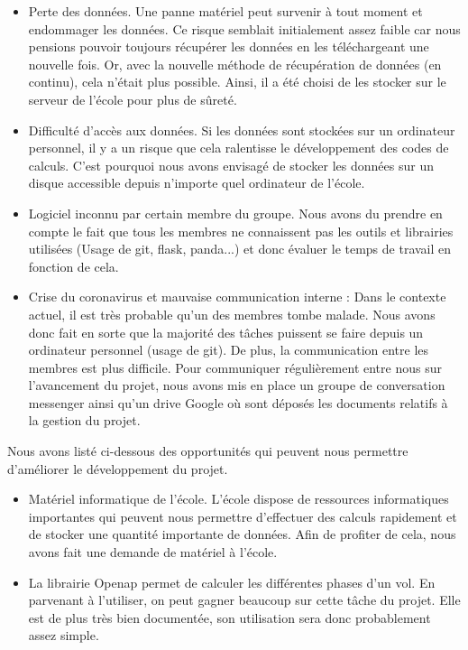 \begin{itemize}
	\item Perte des données. Une panne matériel peut survenir à tout moment et endommager les données. Ce risque semblait initialement assez faible car nous pensions pouvoir toujours récupérer les données en les téléchargeant une nouvelle fois. Or, avec la nouvelle méthode de récupération de données (en continu), cela n'était plus possible. Ainsi, il a été choisi de les stocker sur le serveur de l'école pour plus de sûreté. 
	
	\item Difficulté d'accès aux données. Si les données sont stockées sur un ordinateur personnel, il y a un risque que cela ralentisse le développement des codes de calculs. C'est pourquoi nous avons envisagé de stocker les données sur un disque accessible depuis n'importe quel ordinateur de l'école.
	
	\item Logiciel inconnu par certain membre du groupe. Nous avons du  prendre en compte le fait que tous les membres ne connaissent pas les outils et librairies utilisées (Usage de git, flask, panda...) et donc évaluer le temps de travail en fonction de cela.

	\item Crise du coronavirus et mauvaise communication interne : Dans le contexte actuel, il est très probable qu'un des membres tombe malade. Nous avons donc fait en sorte que la majorité des tâches puissent se faire depuis un ordinateur personnel (usage de git). De plus, la communication entre les membres est plus difficile. Pour communiquer régulièrement entre nous sur l'avancement du projet, nous avons mis en place un groupe de conversation messenger ainsi qu'un drive Google où sont déposés les documents relatifs à la gestion du projet.
	
\end{itemize}


Nous avons listé ci-dessous des opportunités qui peuvent nous permettre d'améliorer le développement du projet.

\begin{itemize}
	\item Matériel informatique de l'école. L'école dispose de ressources informatiques importantes qui peuvent nous permettre d'effectuer des calculs rapidement et de stocker une quantité importante de données. Afin de profiter de cela, nous avons fait une demande de matériel à l'école.
	
	\item La librairie Openap permet de calculer les différentes phases d'un vol. En parvenant à l'utiliser, on peut gagner beaucoup sur cette tâche du projet. Elle est de plus très bien documentée, son utilisation sera donc probablement assez simple.
\end{itemize}
